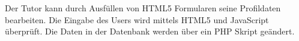 \documentclass[10pt,a4paper]{scrartcl}
\begin{document}
Der Tutor kann durch Ausfüllen von HTML5 Formularen seine Profildaten bearbeiten. Die Eingabe des Users wird mittels HTML5 und JavaScript überprüft. Die Daten in der Datenbank werden über ein PHP Skript geändert.

%
%
%
%

%


%
\end{document}
